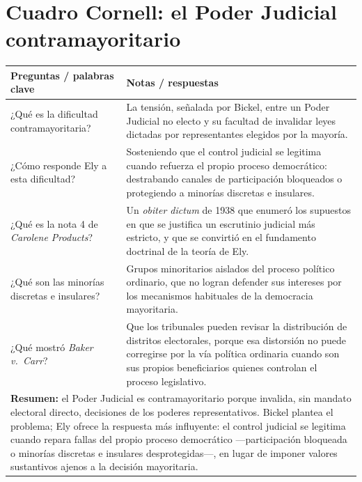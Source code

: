 \documentclass[12pt,oneside]{book}
\begin{document}
\section{Cuadro Cornell: el Poder Judicial contramayoritario}

\begin{longtable}{@{}p{}p{}@{}}
\toprule
\textbf{Preguntas / palabras clave} & \textbf{Notas / respuestas} \\
\midrule
\endhead
¿Qué es la dificultad contramayoritaria? & La tensión, señalada por Bickel, entre
un Poder Judicial no electo y su facultad de invalidar leyes dictadas por
representantes elegidos por la mayoría. \\
¿Cómo responde Ely a esta dificultad? & Sosteniendo que el control judicial se
legitima cuando refuerza el propio proceso democrático: destrabando canales de
participación bloqueados o protegiendo a minorías discretas e insulares. \\
¿Qué es la nota 4 de \textit{Carolene Products}? & Un \textit{obiter dictum} de
1938 que enumeró los supuestos en que se justifica un escrutinio judicial más
estricto, y que se convirtió en el fundamento doctrinal de la teoría de Ely. \\
¿Qué son las minorías discretas e insulares? & Grupos minoritarios aislados del
proceso político ordinario, que no logran defender sus intereses por los
mecanismos habituales de la democracia mayoritaria. \\
¿Qué mostró \textit{Baker v.\ Carr}? & Que los tribunales pueden revisar la
distribución de distritos electorales, porque esa distorsión no puede corregirse
por la vía política ordinaria cuando son sus propios beneficiarios quienes
controlan el proceso legislativo. \\
\midrule
\multicolumn{2}{p{0.95\textwidth}}{\textbf{Resumen:} el Poder Judicial es
contramayoritario porque invalida, sin mandato electoral directo, decisiones de
los poderes representativos. Bickel plantea el problema; Ely ofrece la respuesta
más influyente: el control judicial se legitima cuando repara fallas del propio
proceso democrático —participación bloqueada o minorías discretas e insulares
desprotegidas—, en lugar de imponer valores sustantivos ajenos a la decisión
mayoritaria.} \\
\bottomrule
\end{longtable}

\end{document}
